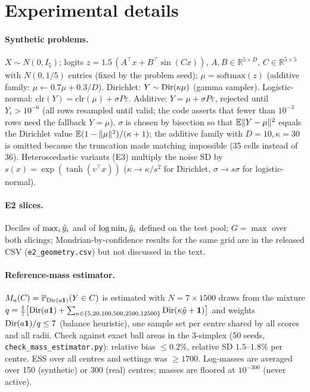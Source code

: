\section{Experimental details}\label{app:details}
\paragraph{Synthetic problems.} $X\sim N(0,I_5)$; logits $z=1.5\,(A^\top x+B^\top\sin(C x))$, $A,B\in\mathbb R^{5\times D}$, $C\in\mathbb R^{5\times5}$ with $N(0,1/5)$ entries (fixed by the problem seed); $\mu=\mathrm{softmax}(z)$ (additive family: $\mu\leftarrow0.7\mu+0.3/D$). Dirichlet: $Y\sim\mathrm{Dir}(\kappa\mu)$ (gamma sampler). Logistic-normal: $\mathrm{clr}(Y)=\mathrm{clr}(\mu)+\sigma P\varepsilon$. Additive: $Y=\mu+\sigma P\varepsilon$, rejected until $Y_i>10^{-6}$ (all rows resampled until valid; the code asserts that fewer than $10^{-3}$ rows need the fallback $Y=\mu$). $\sigma$ is chosen by bisection so that $\mathbb{E}\|Y-\mu\|^2$ equals the Dirichlet value $\mathbb{E}(1-\|\mu\|^2)/(\kappa+1)$; the additive family with $D=10,\kappa=30$ is omitted because the truncation made matching impossible (35 cells instead of 36). Heteroscedastic variants (E3) multiply the noise SD by $s(x)=\exp(\tanh(v^\top x))$ ($\kappa\to\kappa/s^2$ for Dirichlet, $\sigma\to s\sigma$ for logistic-normal).
\paragraph{E2 slices.} Deciles of $\max_i\hat y_i$ and of $\log\min_i\hat y_i$ defined on the test pool; $G=\max$ over both slicings; Mondrian-by-confidence results for the same grid are in the released CSV (\texttt{e2\_geometry.csv}) but not discussed in the text.
\paragraph{Reference-mass estimator.} $M_a(C)=\mathbb{P}_{\mathrm{Dir}(a\mathbf 1)}(Y\in C)$ is estimated with $N=7\times1500$ draws from the mixture $q=\tfrac17\big[\mathrm{Dir}(a\mathbf1)+\sum_{\kappa\in\{5,20,100,500,2500,12500\}}\mathrm{Dir}(\kappa\hat y+\mathbf 1)\big]$ and weights $\mathrm{Dir}(a\mathbf1)/q\le7$ (balance heuristic), one sample set per centre shared by all scores and all radii. Check against exact ball areas in the 3-simplex (50 seeds, \texttt{check\_mass\_estimator.py}): relative bias $\le0.2\%$, relative SD $1.5$--$1.8\%$ per centre. ESS over all centres and settings was $\ge1700$. Log-masses are averaged over 150 (synthetic) or 300 (real) centres; masses are floored at $10^{-300}$ (never active).

